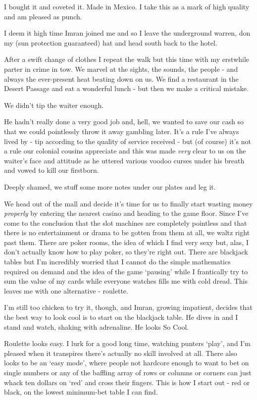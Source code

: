 \documentclass[a5paper,10pt,titlepage,draft]{book}
\begin{document}
I bought it and coveted it.  Made in Mexico. I take this as a mark of high quality and am pleased as punch.

I deem it high time Imran joined me and so I leave the underground warren, don my (sun protection guaranteed) hat and head south back to the hotel.

After a swift change of clothes I repeat the walk but this time with my erstwhile parter in crime in tow.  We marvel at the sights, the sounds, the people - and always the ever-present heat beating down on us.  We find a restaurant in the Desert Passage and eat a wonderful lunch - but then we make a critical mistake.

We didn't tip the waiter enough.

He hadn't really done a very good job and, hell, we wanted to save our cash so that we could pointlessly throw it away gambling later.  It's a rule I've always lived by - tip according to the quality of service received - but (of course) it's not a rule our colonial cousins appreciate and this was made \emph{very} clear to us on the waiter's face and attitude as he uttered various voodoo curses under his breath and vowed to kill our firstborn.

Deeply shamed, we stuff some more notes under our plates and leg it.

We head out of the mall and decide it's time for us to finally start wasting money \emph{properly} by entering the nearest casino and heading to the game floor.  Since I've come to the conclusion that the slot machines are completely pointless and that there is no entertainment or drama to be gotten from them at all, we waltz right past them.  There are poker rooms, the idea of which I find very sexy but, alas, I don't actually know how to play poker, so they're right out.  There are blackjack tables but I'm incredibly worried that I cannot do the simple mathematics required on demand and the idea of the game `pausing' while I frantically try to sum the value of my cards while everyone watches fills me with cold dread.  This leaves me with one alternative - roulette. 

I'm still too chicken to try it, though, and Imran, growing impatient, decides that the best way to look cool is to start on the blackjack table.  He dives in and I stand and watch, shaking with adrenaline.  He looks So Cool.

Roulette looks easy.  I lurk for a good long time, watching punters `play', and I'm pleased when it transpires there's actually no skill involved at all.  There also looks to be an `easy mode', where people not hardcore enough to want to bet on single numbers or any of the baffling array of rows or columns or corners can just whack ten dollars on `red' and cross their fingers.  This is how I start out - red or black, on the lowest minimum-bet table I can find.
\end{document}
